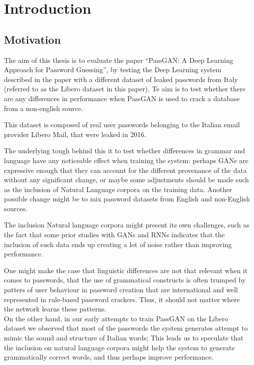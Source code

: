 \section{Introduction}
\subsection{Motivation}
The aim of this thesis is to evaluate the paper \enquote{PassGAN: A Deep Learning Approach for Password Guessing}\cite{PassGAN}, by testing the Deep Learning system described in the paper with a different dataset of leaked passwords from Italy\cite{libero_leak} (referred to as the Libero dataset in this paper). Te aim is to test whether there are any differences in performance when PassGAN is used to crack a database from a non-english source.

This dataset is composed of real user passwords belonging to the Italian email provider Libero Mail, that were leaked in 2016. %

The underlying tough behind this it to test whether differences in grammar and language have any noticeable effect when training the system: perhaps GANs are expressive enough that they 
can account for the different provenance of the data without any significant change, or maybe some adjustments should be made such as the inclusion of Natural Language corpora on the training data. Another possible change might be to mix password datasets from English and non-English sources.

The inclusion Natural language corpora might present its own challenges, such as the fact that some prior studies with GANs and RNNs indicates that the inclusion of such data ends up creating a lot of noise rather than improving performance\cite{Melicher2016}.

One might make the case that linguistic differences are not that relevant when it comes to passwords, that the use of grammatical constructs is often trumped by patters of user behaviour in password creation that are international and well represented in rule-based password crackers. Thus, it should not matter where the network learns these patterns.\\
On the other hand, in our early attempts to train PassGAN on the Libero dataset we observed that most of the passwords the system generates attempt to mimic the sound and structure of Italian words; This leads us to speculate that the inclusion on natural language corpora might help the system to generate grammatically correct words, and thus perhaps improve performance.

